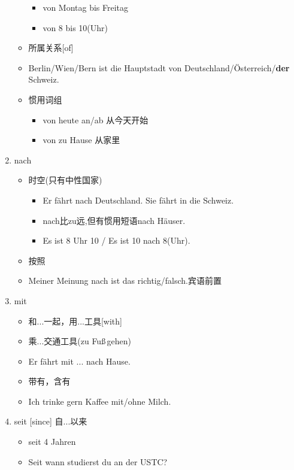 \documentclass[12pt,A4paper,oneside,reqno]{amsart}
\numberwithin{equation}{section}
\theoremstyle{plain}
\theoremstyle{plain}
\theoremstyle{plain}
\numberwithin{equation}{section}
\theoremstyle{remark}
\begin{document}
\begin{enumerate}[1.]
\begin{itemize}
\begin{itemize}
			\item von Montag bis Freitag
			\item von 8 bis 10(Uhr)
		\end{itemize}
		\item 所属关系[of]
		\item [] Berlin/Wien/Bern ist die Hauptstadt von Deutschland/\"{O}sterreich/\textbf{der} Schweiz.
		\item 惯用词组
		\begin{itemize}
			\item von heute an/ab 从今天开始
			\item von zu Hause 从家里
		\end{itemize}
	\end{itemize}
	\item nach
	\begin{itemize}
		\item 时空(只有中性国家)
			\begin{itemize}
				\item Er f\"{a}hrt nach Deutschland. Sie f\"{a}hrt in die Schweiz.
				\item nach比zu远,但有惯用短语nach H\"{a}user.
				\item Es ist 8 Uhr 10 / Es ist 10 nach 8(Uhr).
			\end{itemize}	
		\item 按照
		\item [] Meiner Meinung nach ist das richtig/falsch.宾语前置
	\end{itemize}
\renewcommand\labelitemi{\normalfont\bfseries \textendash}	
	\item mit
	\begin{itemize}
		\item 和...一起，用...工具[with]	
		\item 乘...交通工具(zu Fu\ss$\,$gehen)
		\item [] Er f\"{a}hrt mit ... nach Hause.
		\item 带有，含有
		\item [] Ich trinke gern Kaffee mit/ohne Milch.
	\end{itemize}
	\item seit [since] 自...以来
\begin{itemize}
	\item seit 4 Jahren
	\item Seit wann studierst du an der USTC?
\end{itemize}
\end{enumerate}
\end{document}
